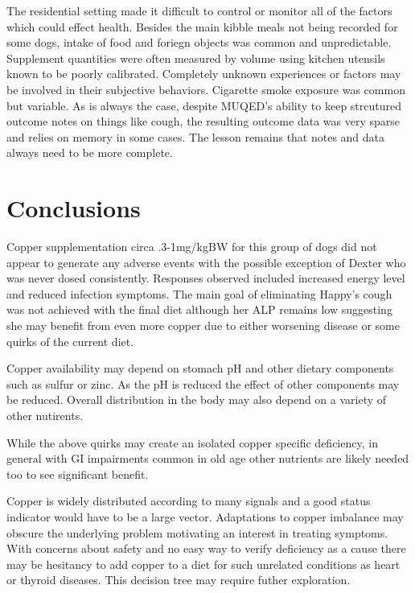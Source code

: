 The residential setting made it difficult to control or monitor
all of the factors which could effect health. Besides the main
kibble meals not being recorded for some dogs, intake of food
and foriegn objects was common and unpredictable. 
Supplement quantities were often measured by volume using kitchen
utensils known to be poorly calibrated. 
Completely unknown experiences or factors may be involved in their
subjective behaviors.  Cigarette smoke exposure was common
but variable.
As is always the case, despite MUQED's ability to keep strcutured
outcome notes on things like cough, the resulting outcome
data was very sparse and relies on memory in some cases.
The lesson remains that notes and data always need to be
more complete. 



\section{Conclusions}


Copper supplementation circa .3-1mg/kgBW for this group of dogs
did not appear to generate any adverse events with the possible
exception of Dexter who was never dosed consistently. 
Responses observed included increased energy level and  reduced 
infection symptoms.
The main goal of eliminating Happy's
cough was not achieved with the final diet although her ALP
remains low suggesting she may benefit from even more copper
due to either worsening disease or some quirks of the current diet.

Copper availability may depend on stomach pH and other dietary
components such as sulfur or zinc. As the pH is reduced the effect of
other components may be reduced. Overall distribution in the body
may also depend on a variety of other nutirents. 

While the above quirks may create an isolated copper specific deficiency,
in general with GI impairments common in old age other nutrients
are likely needed too to see significant benefit.

Copper is widely distributed according to many signals and
a good status indicator would have to be a large vector.
Adaptations to copper imbalance may obscure the underlying problem
motivating an interest in treating symptoms. With concerns about
safety and no easy way to verify deficiency as a cause there may
be hesitancy to add copper to a diet for such unrelated conditions
as heart or thyroid diseases.  This decision tree may 
require futher exploration. 


